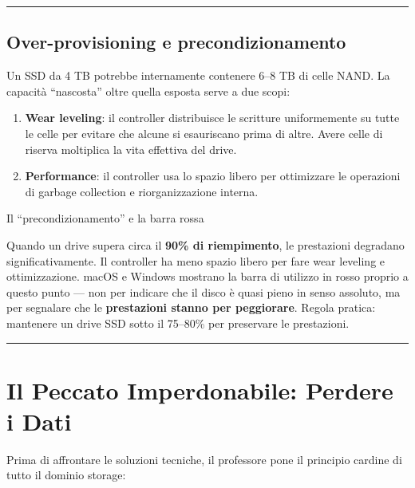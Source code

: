 \documentclass[
  italian,
  openany]{book}
\providecommand{\tightlist}{%
  \setlength{\itemsep}{0pt}\setlength{\parskip}{0pt}}
\begin{document}
\begin{center}\rule{0.5\linewidth}{0.5pt}\end{center}

\subsection{Over-provisioning e
precondizionamento}\label{over-provisioning-e-precondizionamento}

Un SSD da 4 TB potrebbe internamente contenere 6--8 TB di celle NAND. La
capacità ``nascosta'' oltre quella esposta serve a due scopi:

\begin{enumerate}
\def\labelenumi{\arabic{enumi}.}
\tightlist
\item
  \textbf{Wear leveling}: il controller distribuisce le scritture
  uniformemente su tutte le celle per evitare che alcune si esauriscano
  prima di altre. Avere celle di riserva moltiplica la vita effettiva
  del drive.
\item
  \textbf{Performance}: il controller usa lo spazio libero per
  ottimizzare le operazioni di garbage collection e riorganizzazione
  interna.
\end{enumerate}

\begin{calloutwarning}{Il “precondizionamento” e la barra rossa}

Quando un drive supera circa il \textbf{90\% di riempimento}, le
prestazioni degradano significativamente. Il controller ha meno spazio
libero per fare wear leveling e ottimizzazione. macOS e Windows mostrano
la barra di utilizzo in rosso proprio a questo punto --- non per
indicare che il disco è quasi pieno in senso assoluto, ma per segnalare
che le \textbf{prestazioni stanno per peggiorare}. Regola pratica:
mantenere un drive SSD sotto il 75--80\% per preservare le prestazioni.

\end{calloutwarning}

\begin{center}\rule{0.5\linewidth}{0.5pt}\end{center}

\section{Il Peccato Imperdonabile: Perdere i
Dati}\label{il-peccato-imperdonabile-perdere-i-dati}

Prima di affrontare le soluzioni tecniche, il professore pone il
principio cardine di tutto il dominio storage:
\end{document}
